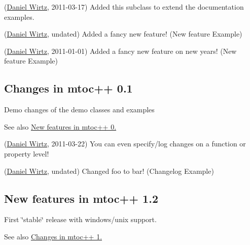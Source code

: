 \begin{DoxyRefList}
\item[\label{newfeat0_1__newfeat0_1000001}%
\hypertarget{newfeat0_1__newfeat0_1000001}{}%
\hyperlink{classexamples_1_1_class}{Class} \hyperlink{classexamples_1_1_inherited_class}{examples\+:\+:Inherited\+Class} ](\hyperlink{developers_dw}{Daniel Wirtz}, 2011-\/03-\/17) Added this subclass to extend the documentation examples. 
\item[\label{newfeat0_1__newfeat0_1000002}%
\hypertarget{newfeat0_1__newfeat0_1000002}{}%
Page \hyperlink{tips}{Tips for doxygen usage with mtoc} ](\hyperlink{developers_dw}{Daniel Wirtz}, undated) Added a fancy new feature! (New feature Example)

(\hyperlink{developers_dw}{Daniel Wirtz}, 2011-\/01-\/01) Added a fancy new feature on new year\textquotesingle{}s! (New feature Example)
\end{DoxyRefList}\hypertarget{changelog0_1}{}\subsection{Changes in mtoc++ 0.1}\label{changelog0_1}
Demo changes of the demo classes and examples

See also \hyperlink{newfeat0_1}{New features in mtoc++ 0.}


\begin{DoxyRefList}
\item[\label{changelog0_1__changelog0_1000001}%
\hypertarget{changelog0_1__changelog0_1000001}{}%
Member \hyperlink{classexamples_1_1_class_aebd897ed5a726cf0f09c5f40a9702484}{examples\+:\+:Class\+:\+:no\+Real\+Arguments} ()](\hyperlink{developers_dw}{Daniel Wirtz}, 2011-\/03-\/22) You can even specify/log changes on a function or property level! 
\item[\label{changelog0_1__changelog0_1000002}%
\hypertarget{changelog0_1__changelog0_1000002}{}%
Page \hyperlink{tips}{Tips for doxygen usage with mtoc} ](\hyperlink{developers_dw}{Daniel Wirtz}, undated) Changed foo to bar! (Changelog Example)
\end{DoxyRefList}\hypertarget{newfeat1_2}{}\subsection{New features in mtoc++ 1.2}\label{newfeat1_2}
First \char`\"{}stable\char`\"{} release with windows/unix support.

See also \hyperlink{changelog1_2}{Changes in mtoc++ 1.}


